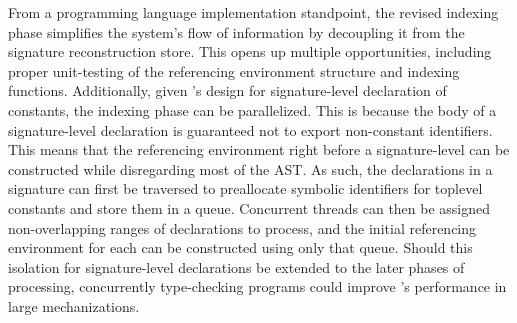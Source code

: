 From a programming language implementation standpoint, the revised indexing phase simplifies the system's flow of information by decoupling it from the signature reconstruction store.
This opens up multiple opportunities, including proper unit-testing of the referencing environment structure and indexing functions.
Additionally, given \Beluga's design for signature-level declaration of constants, the indexing phase can be parallelized.
This is because the body of a signature-level declaration is guaranteed not to export non-constant identifiers.
This means that the referencing environment right before a signature-level can be constructed while disregarding most of the \ac{AST}.
As such, the declarations in a signature can first be traversed to preallocate symbolic identifiers for toplevel constants and store them in a queue.
Concurrent threads can then be assigned non-overlapping ranges of declarations to process, and the initial referencing environment for each can be constructed using only that queue.
Should this isolation for signature-level declarations be extended to the later phases of processing, concurrently type-checking programs could improve \Beluga's performance in large mechanizations.
